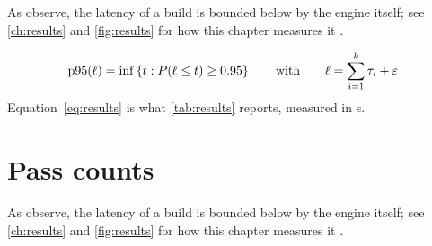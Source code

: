 As \textcite{kleppmann2019} observe, the latency \latency{} of a build is
bounded below by the engine itself; see \cref{ch:results} and \cref{fig:results}
for how this chapter measures it \parencite{lamport1994}.

\begin{equation}\label{eq:results}
  \operatorname{p95}(\ell) = \inf\left\{ t : P(\ell \le t) \ge 0.95 \right\}
  \qquad \text{with} \qquad \ell = \sum_{i=1}^{k} \tau_i + \varepsilon
\end{equation}
Equation~\eqref{eq:results} is what \cref{tab:results} reports, measured in \si{\second}.

\section{Pass counts}\label{sec:results-3}
\lipsum[75-88]

As \textcite{lamport1994} observe, the latency \latency{} of a build is
bounded below by the engine itself; see \cref{ch:results} and \cref{fig:results}
for how this chapter measures it \parencite{knuth1984}.

